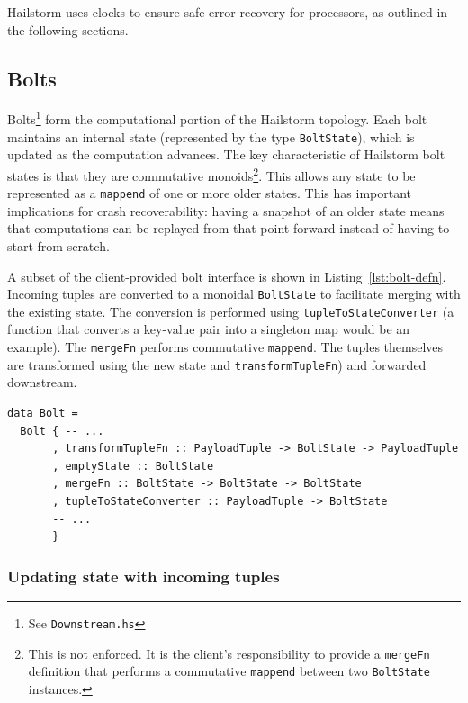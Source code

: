 \documentclass[10pt,nocopyrightspace]{sigplanconf}
\begin{document}
Hailstorm uses clocks to ensure safe error recovery for processors, 
as outlined in the following sections.

\subsection{Bolts}
\label{sec:bolts}

Bolts\footnote{See \texttt{Downstream.hs}} form the computational portion of
the Hailstorm topology. Each bolt maintains an internal state (represented by
the type \lstinline{BoltState}), which is updated as the computation advances.
The key characteristic of Hailstorm bolt states is that they are commutative
monoids\footnote{This is not enforced. It is the client's responsibility to
  provide a \lstinline{mergeFn} definition that performs a commutative
  \lstinline{mappend} between two \lstinline{BoltState} instances.}.  This
  allows any state to be represented as a \lstinline{mappend} of one or more
  older states. This has important implications for crash recoverability:
  having a snapshot of an older state means that computations can be replayed
  from that point forward instead of having to start from scratch.

A subset of the client-provided bolt interface is shown in
Listing~\ref{lst:bolt-defn}. Incoming tuples are converted to a monoidal
\lstinline{BoltState} to facilitate merging with the existing state. The
conversion is performed using \lstinline{tupleToStateConverter} (a function
that converts a key-value pair into a singleton map would be an example). The
\lstinline{mergeFn} performs commutative \lstinline{mappend}. The tuples
themselves are transformed using the new state and
\lstinline{transformTupleFn}) and forwarded downstream.

\begin{lstlisting}[caption=Client interface for a
bolt,label=lst:bolt-defn,float]
data Bolt =
  Bolt { -- ...
       , transformTupleFn :: PayloadTuple -> BoltState -> PayloadTuple
       , emptyState :: BoltState
       , mergeFn :: BoltState -> BoltState -> BoltState
       , tupleToStateConverter :: PayloadTuple -> BoltState
       -- ...
       }
\end{lstlisting}

\subsubsection{Updating state with incoming tuples}
\label{sec:updating-state}
\end{document}
